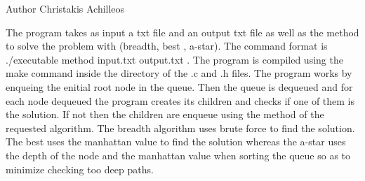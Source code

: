 \begin{DoxyAuthor}{Author}
Christakis Achilleos
\end{DoxyAuthor}
The program takes as input a txt file and an output txt file as well as the method to solve the problem with (breadth, best , a-\/star). The command format is ./executable method input.\+txt output.\+txt . The program is compiled using the make command inside the directory of the .c and .h files. The program works by enqueing the enitial root node in the queue. Then the queue is dequeued and for each node dequeued the program creates its children and checks if one of them is the solution. If not then the children are enqueue using the method of the requested algorithm. The breadth algorithm uses brute force to find the solution. The best uses the manhattan value to find the solution whereas the a-\/star uses the depth of the node and the manhattan value when sorting the queue so as to minimize checking too deep paths. 
